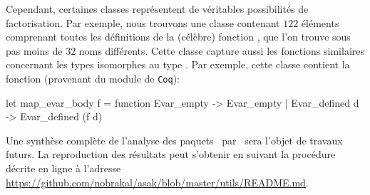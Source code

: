 Cependant, certaines classes représentent de véritables possibilités
de factorisation. Par exemple, nous trouvons une classe contenant
$122$ éléments comprenant toutes les définitions de la (célèbre)
fonction , que l'on trouve sous pas moins de $32$
noms différents. Cette classe capture aussi les fonctions similaires
concernant les types isomorphes au type . Par exemple,
cette classe contient la fonction  (provenant du
module  de \verb|Coq|):

\begin{ocaml}
let map_evar_body f =
  function Evar_empty -> Evar_empty | Evar_defined d -> Evar_defined (f d)
\end{ocaml}

Une synthèse complète de l'analyse des paquets~{\Opam} par~{\Asak} sera l'objet
de travaux futurs. La reproduction des résultats peut s'obtenir en suivant
la procédure décrite en ligne à l'adresse
\url{https://github.com/nobrakal/asak/blob/master/utils/README.md}.

